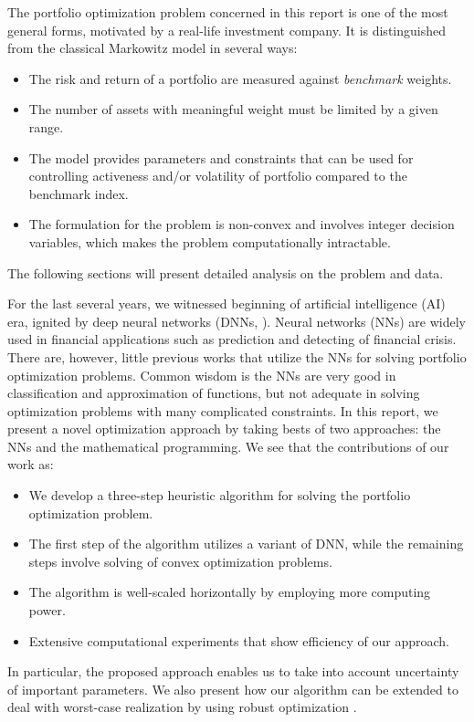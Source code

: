 \documentclass[11pt]{article}
\begin{document}
	The portfolio optimization problem concerned in this report is one of the most general forms, motivated by a real-life investment company. It is distinguished from the classical Markowitz model in several ways:
	\begin{itemize}
		\item The risk and return of a portfolio are measured against \emph{benchmark} weights.
		\item The number of assets with meaningful weight must be limited by a given range.
		\item The model provides parameters and constraints that can be used for controlling activeness and/or volatility of portfolio compared to the benchmark index.
		\item The formulation for the problem is non-convex and involves integer decision variables, which makes the problem computationally intractable.
	\end{itemize}
	The following sections will present detailed analysis on the problem and data.
	
	For the last several years, we witnessed beginning of artificial intelligence (AI) era, ignited by deep neural networks (DNNs, \cite{lecun2015deep}). Neural networks (NNs) are widely used in financial applications such as prediction and detecting of financial crisis. There are, however, little previous works that utilize the NNs for solving portfolio optimization problems. Common wisdom is the NNs are very good in classification and approximation of functions, but not adequate in solving optimization problems with many complicated constraints. In this report, we present a novel optimization approach by taking bests of two approaches: the NNs and the mathematical programming. We see that the contributions of our work as:
	\begin{itemize}
		\item We develop a three-step heuristic algorithm for solving the portfolio optimization problem.
		\item The first step of the algorithm utilizes a variant of DNN, while the remaining steps involve solving of convex optimization problems.
		\item The algorithm is well-scaled horizontally by employing more computing power.
		\item Extensive computational experiments that show efficiency of our approach.
	\end{itemize}
	
	In particular, the proposed approach enables us to take into account uncertainty of important parameters. We also present how our algorithm can be extended to deal with worst-case realization by using robust optimization \citep{bertsimas2004price}. 
	
\end{document}
